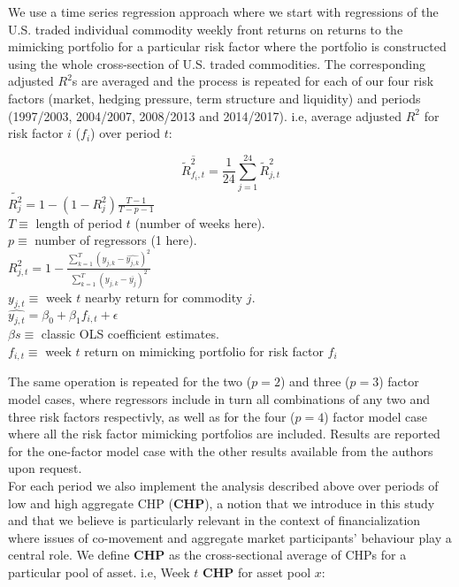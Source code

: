 \documentclass[11pt, letterpaper, doublespacing]{article}
\renewcommand{\footnote}{\endnote}
\let\rmarkdownfootnote\footnote%
\def\footnote{\protect\rmarkdownfootnote}
\begin{document}
We use a time series regression approach where we start with regressions
of the U.S. traded individual commodity weekly front returns on returns
to the mimicking portfolio for a particular risk factor where the
portfolio is constructed using the whole cross-section of U.S. traded
commodities. The corresponding adjusted \(R^{2}\)s are averaged and the
process is repeated for each of our four risk factors (market, hedging
pressure, term structure and liquidity) and periods (1997/2003,
2004/2007, 2008/2013 and 2014/2017). i.e, average adjusted \(R^{2}\) for
risk factor \(i\) (\(f_{i}\)) over period \(t\):

\[\overline{\tilde{R}_{f_{i},t}^{2}}=\frac{1}{24}\sum_{j=1}^{24}\tilde{R}_{j,t}^{2}\]
\(\tilde{R_{j}^{2}}=1-(1-R_{j}^{2})\frac{T-1}{T-p-1}\)\footnote{The
  Wherry formula-1.}\\
\(T\equiv\) length of period \(t\) (number of weeks here).\\
\(p\equiv\) number of regressors (1 here).\\
\(R_{j,t}^{2}=1-\frac{\sum_{k=1}^{T}(y_{j,k}-\hat{y_{j,k}})^{2}}{\sum_{k=1}^{T}(y_{j,k}-\overline{y_{j}})^{2}}\)\\
\(y_{j,t}\equiv\) week \(t\) nearby return for commodity \(j\).\\
\(\hat{y_{j,t}}=\beta_{0}+\beta_{1}f_{i,t}+\epsilon\)\\
\(\beta s \equiv\) classic OLS coefficient estimates.\\
\(f_{i,t}\equiv\) week \(t\) return on mimicking portfolio for risk
factor \(f_{i}\)

The same operation is repeated for the two (\(p=2\)) and three (\(p=3\))
factor model cases, where regressors include in turn all combinations of
any two and three risk factors respectivly, as well as for the four
(\(p=4\)) factor model case where all the risk factor mimicking
portfolios are included. Results are reported for the one-factor model
case with the other results available from the authors upon request.\\
For each period we also implement the analysis described above over
periods of low and high aggregate CHP (\(\mathbf{CHP}\)), a notion that
we introduce in this study and that we believe is particularly relevant
in the context of financialization where issues of co-movement and
aggregate market participants' behaviour play a central role. We define
\(\mathbf{CHP}\) as the cross-sectional average of CHPs for a particular
pool of asset. i.e, Week \(t\) \(\mathbf{CHP}\) for asset pool \(x\):
\end{document}
